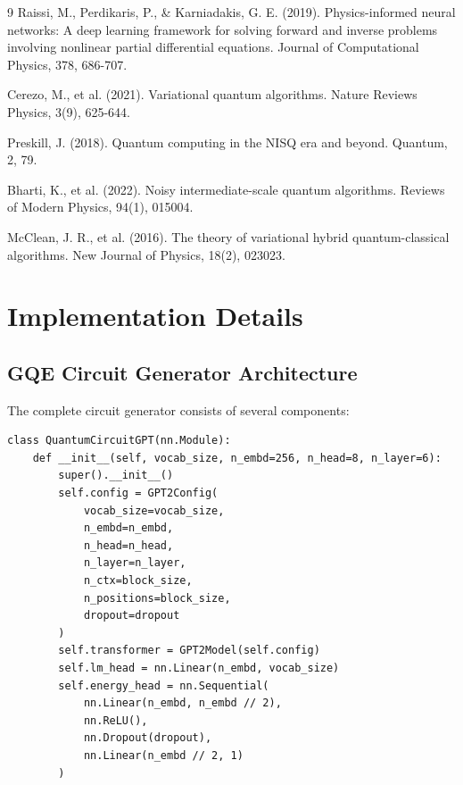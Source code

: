 \documentclass[11pt,a4paper,uplatex,dvipdfmx]{jsarticle}
\begin{document}
\begin{thebibliography}{9}
Raissi, M., Perdikaris, P., \& Karniadakis, G. E. (2019). Physics-informed neural networks: A deep learning framework for solving forward and inverse problems involving nonlinear partial differential equations. Journal of Computational Physics, 378, 686-707.

Cerezo, M., et al. (2021). Variational quantum algorithms. Nature Reviews Physics, 3(9), 625-644.

Preskill, J. (2018). Quantum computing in the NISQ era and beyond. Quantum, 2, 79.

Bharti, K., et al. (2022). Noisy intermediate-scale quantum algorithms. Reviews of Modern Physics, 94(1), 015004.

McClean, J. R., et al. (2016). The theory of variational hybrid quantum-classical algorithms. New Journal of Physics, 18(2), 023023.
\end{thebibliography}

\appendix

\section{Implementation Details}

\subsection{GQE Circuit Generator Architecture}

The complete circuit generator consists of several components:

\begin{lstlisting}[caption={GPT-based circuit generator structure},label={lst:gpt}]
class QuantumCircuitGPT(nn.Module):
    def __init__(self, vocab_size, n_embd=256, n_head=8, n_layer=6):
        super().__init__()
        self.config = GPT2Config(
            vocab_size=vocab_size,
            n_embd=n_embd,
            n_head=n_head,
            n_layer=n_layer,
            n_ctx=block_size,
            n_positions=block_size,
            dropout=dropout
        )
        self.transformer = GPT2Model(self.config)
        self.lm_head = nn.Linear(n_embd, vocab_size)
        self.energy_head = nn.Sequential(
            nn.Linear(n_embd, n_embd // 2),
            nn.ReLU(),
            nn.Dropout(dropout),
            nn.Linear(n_embd // 2, 1)
        )
\end{lstlisting}
\end{document}
